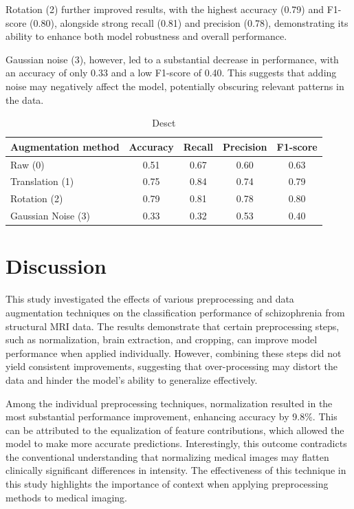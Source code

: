 Rotation (2) further improved results, with the highest accuracy (0.79) and F1-score (0.80), alongside strong recall (0.81) and precision (0.78), demonstrating its ability to enhance both model robustness and overall performance.

Gaussian noise (3), however, led to a substantial decrease in performance, with an accuracy of only 0.33 and a low F1-score of 0.40. This suggests that adding noise may negatively affect the model, potentially obscuring relevant patterns in the data.

\begin{center}
	\begin{table}[t]
		\centering
		\caption{\label{tab:model_meetrics_augmentation}Desct}
		\begin{tabular*}{500pt}{@{\extracolsep\fill}lcccc@{\extracolsep\fill}}
			\toprule
			\textbf{Augmentation method} &\textbf{Accuracy} &  \textbf{Recall} &\textbf{Precision} &\textbf{F1-score}\\
			\midrule
			Raw (0) & 0.51 & 0.67 & 0.60 & 0.63 \\
			Translation (1) & 0.75 & 0.84 & 0.74 & 0.79 \\
			Rotation (2) & 0.79 & 0.81 & 0.78 & 0.80 \\
			Gaussian Noise (3) & 0.33 & 0.32 & 0.53 & 0.40 \\
			\bottomrule
		\end{tabular*}
	\end{table}
\end{center}

\section{Discussion}

This study investigated the effects of various preprocessing and data augmentation techniques on the classification performance of schizophrenia from structural MRI data. The results demonstrate that certain preprocessing steps, such as normalization, brain extraction, and cropping, can improve model performance when applied individually. However, combining these steps did not yield consistent improvements, suggesting that over-processing may distort the data and hinder the model's ability to generalize effectively.

Among the individual preprocessing techniques, normalization resulted in the most substantial performance improvement, enhancing accuracy by 9.8\%. This can be attributed to the equalization of feature contributions, which allowed the model to make more accurate predictions. Interestingly, this outcome contradicts the conventional understanding that normalizing medical images may flatten clinically significant differences in intensity. The effectiveness of this technique in this study highlights the importance of context when applying preprocessing methods to medical imaging.

